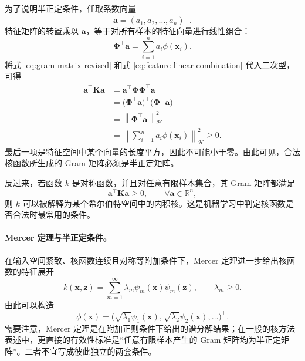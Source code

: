 \documentclass[UTF8,zihao=-4,openany]{ctexbook}
\begin{document}
为了说明半正定条件，任取系数向量
\[
  \boldsymbol a=(a_1,a_2,\ldots,a_n)^\top.
\]
特征矩阵的转置乘以 $\boldsymbol a$，等于对所有样本的特征向量进行线性组合：
\begin{equation}
  \boldsymbol{\Phi}^\top\boldsymbol a
  =
  \sum_{i=1}^{n}a_i\phi(\boldsymbol{x}_i).
  \label{eq:feature-linear-combination}
\end{equation}
将式 \eqref{eq:gram-matrix-revised} 和式 \eqref{eq:feature-linear-combination} 代入二次型，可得
\begin{align*}
  \boldsymbol a^\top\boldsymbol K\boldsymbol a
  &=
  \boldsymbol a^\top
  \boldsymbol{\Phi}\boldsymbol{\Phi}^\top
  \boldsymbol a\\
  &=
  \bigl(\boldsymbol{\Phi}^\top\boldsymbol a\bigr)^\top
  \bigl(\boldsymbol{\Phi}^\top\boldsymbol a\bigr)\\
  &=
  \left\|
  \boldsymbol{\Phi}^\top\boldsymbol a
  \right\|_{\mathcal H}^{2}\\
  &=
  \left\|
  \sum_{i=1}^{n}a_i\phi(\boldsymbol{x}_i)
  \right\|_{\mathcal H}^{2}
  \geq0.
\end{align*}
最后一项是特征空间中某个向量的长度平方，因此不可能小于零。由此可见，合法核函数所生成的 Gram 矩阵必须是半正定矩阵。

反过来，若函数 $k$ 是对称函数，并且对任意有限样本集合，其 Gram 矩阵都满足
\[
  \boldsymbol a^\top\boldsymbol K\boldsymbol a\geq0,
  \qquad \forall\boldsymbol a\in\mathbb R^n,
\]
则 $k$ 可以被解释为某个希尔伯特空间中的内积核。这是机器学习中判定核函数是否合法时最常用的条件。

\paragraph{Mercer 定理与半正定条件。}
在输入空间紧致、核函数连续且对称等附加条件下，Mercer 定理进一步给出核函数的特征展开
\begin{equation}
  k(\boldsymbol{x},\boldsymbol{z})
  =
  \sum_{m=1}^{\infty}
  \lambda_m\psi_m(\boldsymbol{x})\psi_m(\boldsymbol{z}),
  \qquad
  \lambda_m\geq0.
  \label{eq:mercer-expansion}
\end{equation}
由此可以构造
\[
  \phi(\boldsymbol{x})
  =
  \bigl(
  \sqrt{\lambda_1}\psi_1(\boldsymbol{x}),
  \sqrt{\lambda_2}\psi_2(\boldsymbol{x}),
  \ldots
  \bigr)^\top.
\]
需要注意，Mercer 定理是在附加正则条件下给出的谱分解结果；在一般的核方法表述中，更直接的有效性标准是“任意有限样本产生的 Gram 矩阵均为半正定矩阵”。二者不宜写成彼此独立的两套条件。
\end{document}
